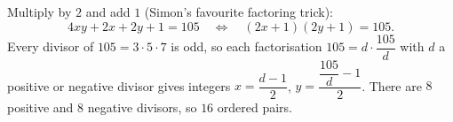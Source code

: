 Multiply by $2$ and add $1$ (Simon's favourite factoring trick):
\[4xy+2x+2y+1=105\quad\Longleftrightarrow\quad(2x+1)(2y+1)=105.\]
Every divisor of $105=3\cdot5\cdot7$ is odd, so each factorisation $105=d\cdot\dfrac{105}{d}$ with $d$ a positive or negative divisor gives integers $x=\dfrac{d-1}{2}$, $y=\dfrac{\dfrac{105}{d}-1}{2}$. There are $8$ positive and $8$ negative divisors, so $\boxed{16}$ ordered pairs.
